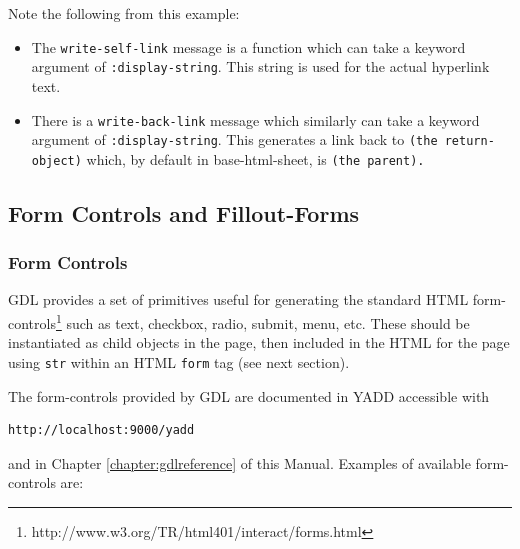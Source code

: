 \documentclass [11pt]{book}
\begin{document}
 Note the following from this example:

\begin{itemize}

\item The \texttt{write-self-link} message is a function which can take a keyword argument
   of \texttt{:display-string}. This string is used for the actual hyperlink text.

\item There is a \texttt{write-back-link} message which similarly can take a keyword argument of \texttt{:display-string}. This generates a link back to \texttt{(the return-object)} which, by default in base-html-sheet, is \texttt{(the parent).}

\end{itemize}





\subsection{Form Controls and Fillout-Forms}

\label{subsec:formcontrolsandfillout-forms}



\subsubsection{Form Controls}

\label{subsubsec:formcontrols}



GDL provides a set of primitives useful for generating the
       standard HTML form-controls\footnote{http://www.w3.org/TR/html401/interact/forms.html} such as text, checkbox, radio, submit, menu, etc. These
            should be instantiated as child objects in the page, then
            included in the HTML for the page
            using \texttt{str} within an
            HTML \texttt{form} tag (see next section).



The form-controls provided by GDL are documented in YADD accessible with 

\begin{verbatim}http://localhost:9000/yadd
\end{verbatim} and in Chapter 
\ref{chapter:gdlreference} of this Manual. Examples of 
available form-controls are:
\end{document}

